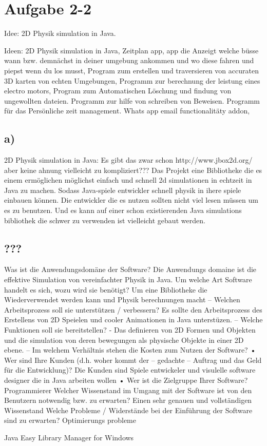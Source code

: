 \chapter{Aufgabe 2-2}
Idee: 2D Physik simulation in Java.

Ideen: 2D Physik simulation in Java, Zeitplan app, app die Anzeigt welche büsse wann bzw. demnächst in deiner umgebung ankommen und wo diese fahren und piepst wenn du los musst,  Program zum erstellen und traversieren von accuraten 3D karten von echten Umgebungen, Programm zur berechnung der leistung eines electro motors,  Program zum Automatischen Löschung und findung von ungewollten dateien. Programm zur hilfe von schreiben von Beweisen. Programm für das Persönliche zeit management.  Whats app email functionalitäty addon, 

\section{a)}
2D Physik simulation in Java:
Es gibt das zwar schon http://www.jbox2d.org/ aber keine ahnung vielleicht zu kompliziert???
Das Projekt eine Bibliotheke die es einem ermöglichen möglichst einfach und schnell 2d simulationen in echtzeit in Java zu machen. Sodass Java-spiele entwickler schnell physik in ihere spiele einbauen können. Die entwickler die es nutzen sollten nicht viel lesen müssen um es zu benutzen. Und es kann auf einer schon existierenden Java simulations bibliothek die schwer zu verwenden ist vielleicht gebaut werden.

\section{???}

Was ist die Anwendungsdomäne der Software?
Die Anwendungs domaine ist die effektive Simulation von vereinfachter Physik in Java. 
Um welche Art Software handelt es sich, wozu wird sie benötigt?
Um eine Bibliotheke die Wiederverwendet werden kann und Physik berechnungen macht
– Welchen Arbeitsprozess soll sie unterstützen / verbessern?
Es sollte den Arbeitsprozess des Erstellens von 2D Speielen und cooler Animationen in Java unterstüzen.
– Welche Funktionen soll sie bereitstellen?
- Das definieren von 2D Formen und Objekten und die simulation von deren bewegungen als physische Objekte in einer 2D ebene.
– Im welchem Verhältnis stehen die Kosten zum Nutzen der Software?
• Wer sind Ihre Kunden (d.h. woher kommt der – gedachte – Auftrag und das Geld
für die Entwicklung)?
Die Kunden sind Spiele entwickeler und visulelle software designer die in Java arbeiten wollen
• Wer ist die Zielgruppe Ihrer Software?
Programmierer
Welcher Wissenstand im Umgang mit der Software ist von den Benutzern notwendig bzw. zu erwarten?
Einen sehr genauen und vollständigen Wissenstand
Welche Probleme / Widerstände bei der Einführung der Software sind zu erwarten?
Optimierungs probleme

Java Easy Library Manager for Windows

    